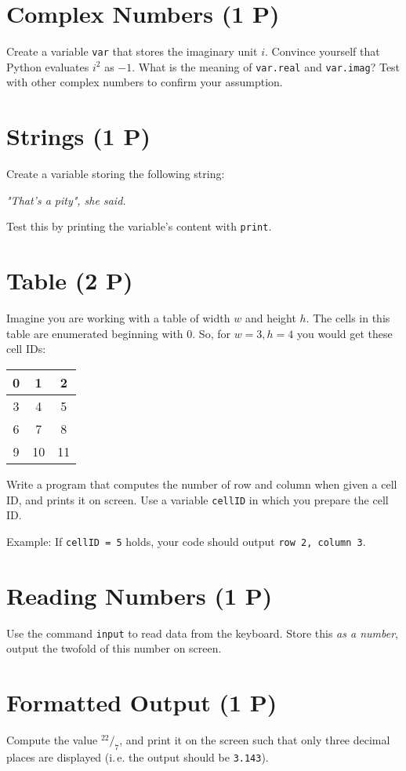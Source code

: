 \documentclass[
	english,
	fontsize=10pt,
	parskip=half,
	titlepage=true,
	DIV=12
]{scrartcl}
\newcommand*{\tabcrlf}{\\ \hline}
\newcommand*{\inPy}[1]{\texttt{#1}}
\newcommand*{\ie}{i.\,e. }
\begin{document}
\section{Complex Numbers (1 P)}
Create a variable \texttt{var} that stores the imaginary unit $i$. Convince yourself that Python evaluates $i^2$ as $-1$. What is the meaning of \texttt{var.real} and \texttt{var.imag}? Test with other complex numbers to confirm your assumption.

\section{Strings (1 P)}
Create a variable storing the following string:
\begin{center}
	\emph{"That's a pity", she said.}
\end{center}

Test this by printing the variable's content with \inPy{print}.

\section{Table (2 P)}
Imagine you are working with a table of width $w$ and height $h$. The cells in this table are enumerated beginning with 0. So, for $w = 3, h = 4$ you would get these cell IDs:
\begin{center}
\begin{tabular}{|c|c|c|}
	\hline
	 0 &  1 &  2 \tabcrlf 
	 3 &  4 &  5 \tabcrlf
	 6 &  7 &  8 \tabcrlf
	 9 & 10 & 11 \tabcrlf
\end{tabular}
\end{center}

Write a program that computes the number of row and column when given a cell ID, and prints it on screen. Use a variable \texttt{cellID} in which you prepare the cell ID.

Example: If \inPy{cellID = 5} holds, your code should output \texttt{row 2, column 3}.

\section{Reading Numbers (1 P)}
Use the command \inPy{input} to read data from the keyboard. Store this \emph{as a number}, output the twofold of this number on screen.

\section{Formatted Output (1 P)}
Compute the value $^{22}/_{7}$, and print it on the screen such that only three decimal places are displayed (\ie the output should be \texttt{3.143}).
\end{document}
